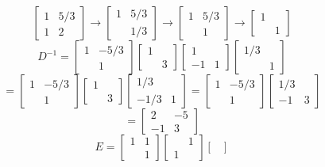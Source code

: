 \documentclass[12pt]{article}
\begin{document}
\begin{itemize}
$$\begin{bmatrix}
1 & 5/3 \\
1 & 2
\end{bmatrix} \rightarrow \begin{bmatrix}
1 & 5/3 \\
& 1/3
\end{bmatrix} \rightarrow \begin{bmatrix}
1 & 5/3 \\
& 1
\end{bmatrix} \rightarrow \begin{bmatrix}
1 & \\
& 1
\end{bmatrix}$$
$$D^{-1} = \begin{bmatrix}
1 & -5/3 \\
& 1
\end{bmatrix}\begin{bmatrix}
1 & \\
& 3
\end{bmatrix}\begin{bmatrix}
1 & \\
-1 & 1
\end{bmatrix}\begin{bmatrix}
1/3 & \\
& 1
\end{bmatrix}$$
$$= \begin{bmatrix}
1 & -5/3 \\
& 1
\end{bmatrix}\begin{bmatrix}
1 & \\
& 3
\end{bmatrix}\begin{bmatrix}
1/3 & \\
-1/3 & 1
\end{bmatrix} = \begin{bmatrix}
1 & -5/3 \\
& 1
\end{bmatrix}\begin{bmatrix}
1/3 & \\
-1 & 3
\end{bmatrix}$$
$$= \begin{bmatrix}
2 & -5 \\
-1 & 3
\end{bmatrix}$$
$$E = \begin{bmatrix}
1 & 1 \\
& 1
\end{bmatrix}\begin{bmatrix}
& 1 \\
1 &
\end{bmatrix}\begin{bmatrix}

\end{bmatrix}$$
\end{itemize}
\end{document}
